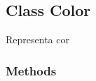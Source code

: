 
\subsection{Class Color}

    \label{color:Color}
Representa cor



  \subsubsection{Methods}

    \label{color:Color:color_replace}

    \vspace{0.5ex}

